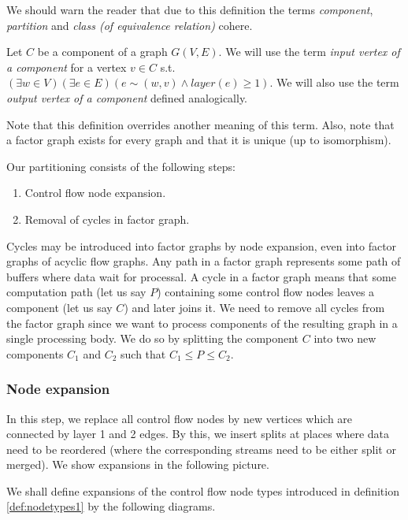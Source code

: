 \begin{rem} 
  We should warn the reader that due to this definition the terms \emph{component}, \emph{partition} and \emph{class (of equivalence relation)} cohere.
\end{rem}

  Let $C$ be a component of a graph $G(V,E)$. We will use the term \emph{input vertex of a component} for a vertex $v \in C$ s.t. $(\exists w \in V)(\exists e \in E)( e \sim (w,v) \land layer(e) \geq 1 )$. We will also use the term \emph{output vertex of a component} defined analogically.
\myenddef

Note that this definition overrides another meaning of this term. Also, note that a factor graph exists for every graph and that it is unique (up to isomorphism).

Our partitioning consists of the following steps:
\begin{enumerate}
  \item Control flow node expansion. 
  \item Removal of cycles in factor graph. 
\end{enumerate}

Cycles may be introduced into factor graphs by node expansion, even into factor graphs of acyclic flow graphs. Any path in a factor graph represents some path of buffers where data wait for processal. A cycle in a factor graph means that some computation path (let us say $P$) containing some control flow nodes leaves a component (let us say $C$) and later joins it. We need to remove all cycles from the factor graph since we want to process components of the resulting graph in a single processing body. We do so by splitting the component $C$ into two new components $C_1$ and $C_2$ such that $C_1 \leq P \leq C_2$.

\subsubsection{Node expansion}

In this step, we replace all control flow nodes by new vertices which are connected by layer 1 and 2 edges. By this, we insert splits at places where data need to be reordered (where the corresponding streams need to be either split or merged). We show expansions in the following picture.

We shall define expansions of the control flow node types introduced in definition \ref{def:nodetypes1} by the following diagrams.
\myenddef

